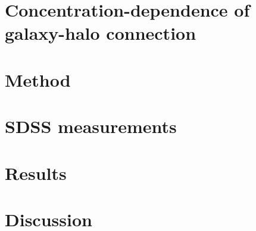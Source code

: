 \documentclass[12pt, preprint]{aastex}
\newcommand{\beq}{\begin{equation}}
\newcommand{\eeq}{\end{equation}}
\begin{document}


\section{Concentration-dependence of galaxy-halo connection}

\section{Method}

\section{SDSS measurements}

\section{Results}

\section{Discussion}


\begin{thebibliography}{70}


\end{thebibliography}
\end{document}

